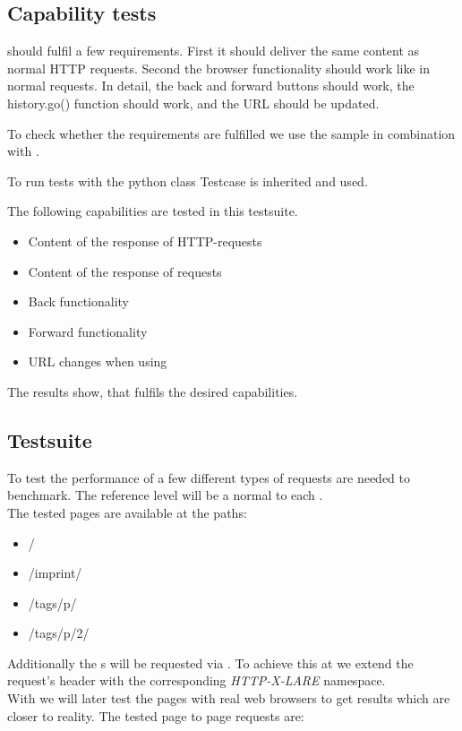 \subsection{Capability tests\label{browser_functionality_tests}}

\lare{} should fulfil a few requirements.
First it should deliver the same content as normal HTTP requests.
Second the browser functionality should work like in normal requests.
In detail, the back and forward buttons should work, the history.go() function should work, and the URL should be updated.

To check whether the requirements are fulfilled we use the sample \webApplication{} in combination with \selenium{}.

To run tests with \selenium{} the python class Testcase is inherited and used.

The following capabilities are tested in this testsuite.
\begin{itemize}
\item Content of the response of HTTP-requests
\item Content of the response of \lare{} requests
\item Back functionality
\item Forward functionality
\item URL changes when using \lare{}
\end{itemize}

The results show, that \lare{} fulfils the desired capabilities.

\subsection{Testsuite\label{testsuite}}

To test the performance of \lare{} a few different types of requests are needed to benchmark.
The reference level will be a normal \httpRequest{} to each \webPage{}.
\\
The tested pages are available at the paths:

\begin{itemize}
\item /
\item /imprint/
\item /tags/p/
\item /tags/p/2/
\end{itemize}

\noindent{}Additionally the \webPage{}s will be requested via \lare{}.
To achieve this at \curl{} we extend the request's header with the corresponding \emph{HTTP-X-LARE} namespace.
\\
With \selenium{} we will later test the pages with real web browsers to get results which are closer to reality.
The tested page to page requests are:

